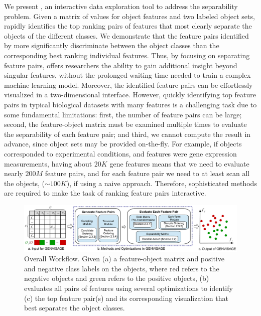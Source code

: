 We present \genviz,
an interactive data exploration tool to address the separability problem.
Given a matrix of values for object features
and two labeled object sets, \genviz rapidly identifies
the top ranking pairs of features
that most clearly separate the objects of
the different classes.
We demonstrate that the feature pairs identified by \genviz more significantly
discriminate between the object classes than the corresponding
best ranking individual features.
Thus, by focusing on separating feature pairs, \genviz
offers researchers the ability to gain additional
insight beyond singular features, without the prolonged waiting time
needed to train a complex machine learning model.
Moreover, the identified feature pairs can be effortlessly
visualized in a two-dimensional interface.
However, quickly identifying top feature pairs
in typical biological datasets with many features
is a challenging task due to some fundamental limitations:
first, the number of feature pairs can be large;
second, the feature-object matrix must be examined
multiple times to evaluate the separability of
each feature pair;
and third, we cannot compute the result in advance, since
object sets may be provided on-the-fly.
For example, if objects corresponded to experimental
conditions, and features were gene expression measurements,
having about $20K$ gene features
means that we need to evaluate nearly $200M$ feature pairs,
and for each feature pair we need to at least scan all the objects,
($\sim100K$), if using a naive approach.
Therefore, sophisticated methods are required
to make the task of ranking feature pairs interactive.

\begin{figure}[t]
 \centering
 \includegraphics[width=0.9\linewidth]{fig/workflow2.pdf}
 \vspace{-10pt}
\caption{Overall \genviz Workflow.
Given (a) a feature-object matrix and positive and negative class labels on the objects, where red refers to the negative objects and green refers to the positive objects, \genviz (b) evaluates all pairs of features using several optimizations to identify (c) the top feature pair(s) and its corresponding visualization that best separates the object classes.}
\label{fig:workflow}
\vspace{-10pt}
\end{figure}


